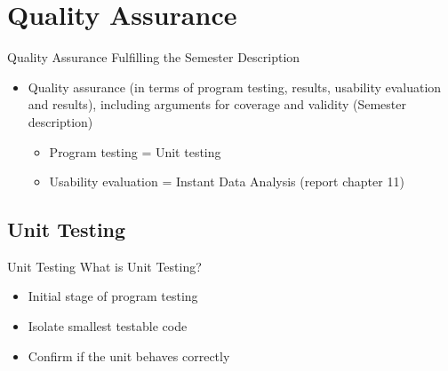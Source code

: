 \section{Quality Assurance}

\begin{frame}[fragile] {Quality Assurance} {Fulfilling the Semester Description}
	\begin{itemize}
		\item Quality assurance (in terms of program testing, results, usability evaluation and results), including arguments for coverage and validity {\footnotesize (Semester description)}
		\begin{itemize}
			\item Program testing = Unit testing
			\item Usability evaluation = Instant Data Analysis (report chapter 11)
		\end{itemize}				
	\end{itemize}

\end{frame}

\subsection{Unit Testing}

\begin{frame}[fragile] {Unit Testing} {What is Unit Testing?}
	\begin{itemize}
		\item Initial stage of program testing
		\item Isolate smallest testable code
		\item Confirm if the unit behaves correctly
	\end{itemize}
\end{frame}

